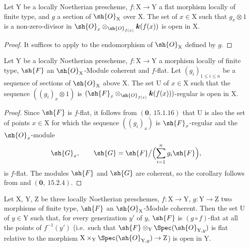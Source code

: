 \begin{corollary}[11.1.3]
\label{IV.11.1.3}
Let $\mathrm{Y}$ be a locally Noetherian prescheme,
$f:\mathrm{X}\to\mathrm{Y}$ a flat morphism locally of finite type, and
$g$ a section of $\sh{O}_\mathrm{X}$ over $\mathrm{X}$. The set of
$x\in\mathrm{X}$ such that $g_x\otimes 1$ is a non-zero-divisor in
$\sh{O}_x\otimes_{\sh{O}_{f(x)}}\boldsymbol{k}(f(x))$ is open in
$\mathrm{X}$.
\end{corollary}

\begin{proof}
It suffices to apply  to the endomorphism of $\sh{O}_\mathrm{X}$ defined by $g$.
\end{proof}

\begin{corollary}[11.1.4]
\label{IV.11.1.4}
Let $\mathrm{Y}$ be a locally Noetherian prescheme, $f:\mathrm{X}\to\mathrm{Y}$ a morphism locally of finite type, $\sh{F}$ an $\sh{O}_\mathrm{X}$-Module coherent and $f$-flat. Let $(g_i)_{1\leqslant i\leqslant n}$ be a sequence of sections of $\sh{O}_\mathrm{X}$ above $\mathrm{X}$. The set $\mathrm{U}$ of $x\in\mathrm{X}$ such that the sequence $((g_i)_x\otimes 1)$ is $(\sh{F}_x\otimes_{\sh{O}_{f(x)}}\boldsymbol{k}(f(x)))$-regular is open in $\mathrm{X}$.
\end{corollary}

\begin{proof}
Since $\sh{F}$ is $f$-flat, it follows from
$(\mathbf{0},~15.1.16)$ that $\mathrm{U}$ is also the set of points
$x\in\mathrm{X}$ for which the sequence $((g_i)_x)$ is
$\sh{F}_x$-regular and the $\sh{O}_x$-module
\[
  \sh{G}_x,\qquad
  \sh{G}=\sh{F}\big/\Bigl(\sum_{i=1}^n g_i\sh{F}\Bigr),
\]
is $f$-flat. The modules $\sh{F}$ and $\sh{G}$ are coherent, so the
corollary follows from  and
$(\mathbf{0},~15.2.4)$.
\end{proof}

\begin{corollary}[11.1.5]
\label{IV.11.1.5}
Let $\mathrm{X}$, $\mathrm{Y}$, $\mathrm{Z}$ be three locally Noetherian preschemes, $f:\mathrm{X}\to\mathrm{Y}$, $g:\mathrm{Y}\to\mathrm{Z}$ two morphisms of finite type, $\sh{F}$ an $\sh{O}_\mathrm{X}$-Module coherent. Then the set $\mathrm{U}$ of $y\in\mathrm{Y}$ such that, for every generization $y'$ of $y$, $\sh{F}$ is $(g\circ f)$-flat at all the points of $f^{-1}(y')$ (i.e.\ such that $\sh{F}\otimes_\mathrm{Y}\Spec(\sh{O}_{\mathrm{Y},y})$ is flat relative to the morphism $\mathrm{X}\times_\mathrm{Y}\Spec(\sh{O}_{\mathrm{Y},y})\to\mathrm{Z}$) is open in $\mathrm{Y}$.
\end{corollary}

